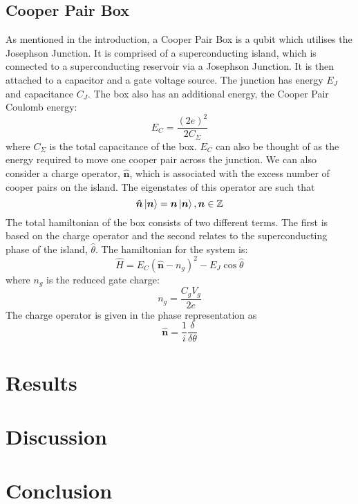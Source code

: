 \documentclass[11pt]{article}
\begin{document}
   \subsection{Cooper Pair Box}
   As mentioned in the introduction, a Cooper Pair Box is a qubit which utilises the Josephson Junction. It is comprised of a superconducting island, which is connected to a superconducting reservoir via a Josephson Junction. It is then attached to a capacitor and a gate voltage source. The junction has energy $E_J$ and capacitance $C_J$. The box also has an additional energy, the Cooper Pair Coulomb energy:
	\begin{equation}
	E_C =  \frac{(2e)^2}{2C_\Sigma}
	\end{equation}
	where $C_\Sigma$ is the total capacitance of the box. $E_C$ can also be thought of as the energy required to move one cooper pair across the junction. We can also consider a charge operator, $\boldsymbol{\hat{n}}$, which is associated with the excess number of cooper pairs on the island. The eigenstates of this operator are such that
	\begin{equation}
	\boldsymbol{\hat{n}}\ket{\boldsymbol{n}} = \boldsymbol{n}\ket{\boldsymbol{n}},  \boldsymbol{n} \in \mathbb{Z}
	\end{equation}
The total hamiltonian of the box consists of two different terms. The first is based on the charge operator and the second relates to the superconducting phase of the island, $\hat{\theta}$. The hamiltonian for the system is:
	\begin{equation}
	\hat{H} = E_C (\boldsymbol{\hat{n}} - n_g)^2 - E_J \cos{\hat{\theta}}
	\end{equation}
where $n_g$ is the reduced gate charge:
	\begin{equation}
	n_g = \frac{C_g V_g}{2e}
	\end{equation}
The charge operator is given in the phase representation as
	\begin{equation}
	\boldsymbol{\hat{n}} = \frac{1}{i} \frac{\delta}{\delta\theta}
	\end{equation}


    \section{Results}

    \section{Discussion}

    \section{Conclusion}
\end{document}
